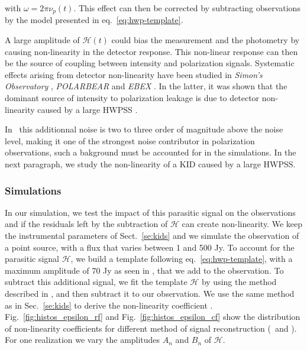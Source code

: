 with $\omega = 2 \pi \nu_{p}(t)$.
This effect can then be corrected by subtracting observations by the model presented in eq.~\ref{eq:hwp-template}. 

A large amplitude of $\mathcal{H}(t)$ could bias the measurement and the photometry by causing non-linearity in the detector response. This non-linear response can then be the source of coupling between intensity and polarization signals. Systematic effects arising from detector non-linearity have been studied in \emph{Simon's Observatory} \citep{2018SPIE10708E..48S}, \emph{POLARBEAR} \citep{2017JCAP...05..008T} and \emph{EBEX} \citep{2017arXiv171101314D}. In the latter, it was shown that the dominant source of intensity to polarization leakage is due to detector non-linearity caused by a large HWPSS \citep{2017arXiv171101314D}.

In \nikad\ this additionnal noise is two to three order of magnitude above the noise level, making it one of the strongest noise contributor in polarization observations, such a bakground must be accounted for in the simulations. In the next paragraph, we study the non-linearity of a KID caused by a large HWPSS. 

\subsubsection{Simulations}

In our simulation, we test the impact of this parasitic signal on the observations and if the residuals left by the subtraction of $\mathcal{H}$ can create non-linearity. We keep the instrumental parameters of Sect.~\ref{se:kids} and we simulate the observation of a point source, with a flux that varies between 1 and 500 Jy. To account for the parasitic signal $\mathcal{H}$, we build a template following eq.~\ref{eq:hwp-template}, with a maximum amplitude of 70 Jy as seen in \nikad , that we add to the observation. To subtract this additional signal, we fit the template $\mathcal{H}$ by using the method described in \citep{2017A&A...599A..34R}, and then subtract it to our observation. We use the same method as in Sec.~\ref{se:kids} to derive the non-linearity coefficient \epsDET . Fig.~\ref{fig:histos_epsilon_rf} and Fig.~\ref{fig:histos_epsilon_cf} show the distribution of non-linearity coefficients for different method of signal reconstruction (\methodu\ and \methodd). For one realization we vary the amplitudes $A_{n}$ and $B_{n}$ of $\mathcal{H}$.

